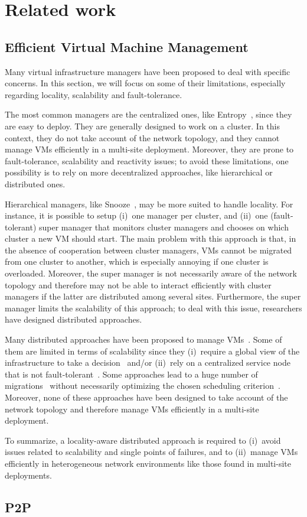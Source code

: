 \section{Related work}

\subsection{Efficient Virtual Machine Management}

Many virtual infrastructure managers have been proposed to deal with specific
concerns.
%
In this section, we will focus on some of their limitations, especially
regarding locality, scalability and fault-tolerance.

The most common managers are the centralized ones, like
Entropy~\cite{hermenier:cp11}, since they are easy to deploy.
%
They are generally designed to work on a cluster.
%
In this context, they do not take account of the network topology, and they
cannot manage VMs efficiently in a multi-site deployment.
%
Moreover, they are prone to fault-tolerance, scalability and reactivity
issues; to avoid these limitations, one possibility is to rely on more
decentralized approaches, like hierarchical or distributed ones.

Hierarchical managers, like Snooze~\cite{feller:ccgrid12}, may be more suited to
handle locality.
%
For instance, it is possible to setup (i)~one manager per cluster, and (ii)~one
(fault-tolerant) super manager that monitors cluster managers and chooses on
which cluster a new VM should start.
%
%
The main problem with this approach is that, in the absence of cooperation
between cluster managers, VMs cannot be migrated from one cluster to another,
which is especially annoying if one cluster is overloaded.
%
Moreover, the super manager is not necessarily aware of the network topology and
therefore may not be able to interact efficiently with cluster managers if the
latter are distributed among several sites.
%
Furthermore, the super manager limits the scalability of this approach; to deal
with this issue, researchers have designed distributed approaches.

Many distributed approaches have been proposed to manage
VMs~\cite{barbagallo:lncs10,feller:cloudcom12,marzolla:wowmom11,mastroianni:europar11,rouzaudcornabas:vhpc10,yazir:cloud10}.
%
Some of them are limited in terms of scalability since they (i)~require a global
view of the infrastructure to take a
decision~\cite{rouzaudcornabas:vhpc10,yazir:cloud10} and/or (ii)~rely on a
centralized service node that is not
fault-tolerant~\cite{mastroianni:europar11,yazir:cloud10}.
%
Some approaches lead to a huge number of
migrations~\cite{barbagallo:lncs10,mastroianni:europar11} without necessarily
optimizing the chosen scheduling criterion~\cite{barbagallo:lncs10}.
%
Moreover, none of these approaches have been designed to take account of the
network topology and therefore manage VMs efficiently in a multi-site
deployment.

To summarize, a locality-aware distributed approach is required to (i)~avoid
issues related to scalability and single points of failures, and to (ii)~manage
VMs efficiently in heterogeneous network environments like those found in
multi-site deployments.

\subsection{P2P}

